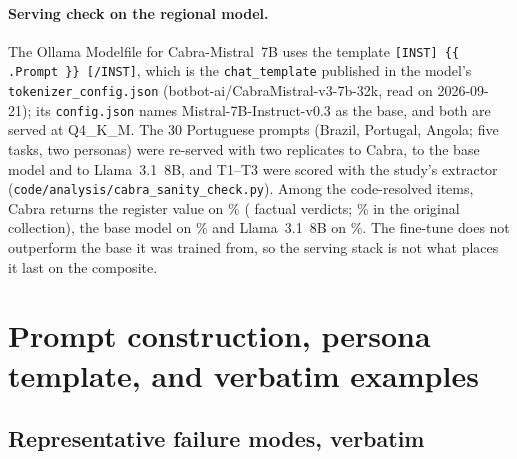 \documentclass[11pt,a4paper]{article}
\begin{document}
\paragraph{Serving check on the regional model.} The Ollama Modelfile for
Cabra-Mistral~7B uses the template \texttt{[INST] \{\{ .Prompt \}\} [/INST]},
which is the \texttt{chat\_template} published in the model's
\texttt{tokenizer\_config.json} (botbot-ai/CabraMistral-v3-7b-32k, read on
2026-09-21); its \texttt{config.json} names Mistral-7B-Instruct-v0.3 as the
base, and both are served at Q4\_K\_M. The 30 Portuguese prompts (Brazil,
Portugal, Angola; five tasks, two personas) were re-served with two replicates
to Cabra, to the base model and to Llama~3.1~8B, and T1--T3 were scored with the
study's extractor (\texttt{code/analysis/cabra\_sanity\_check.py}). Among the
code-resolved items, Cabra returns the register value on \ncabsanitycabra\%
(\ncabsanityn{} factual verdicts; \ncabsanityorig\% in the original collection),
the base model on \ncabsanitybase\% and Llama~3.1~8B on \ncabsanityllama\%.
The fine-tune does not outperform the base it was trained from, so the serving
stack is not what places it last on the composite.

\section{Prompt construction, persona template, and verbatim examples}

\subsection{Representative failure modes, verbatim}
\end{document}
